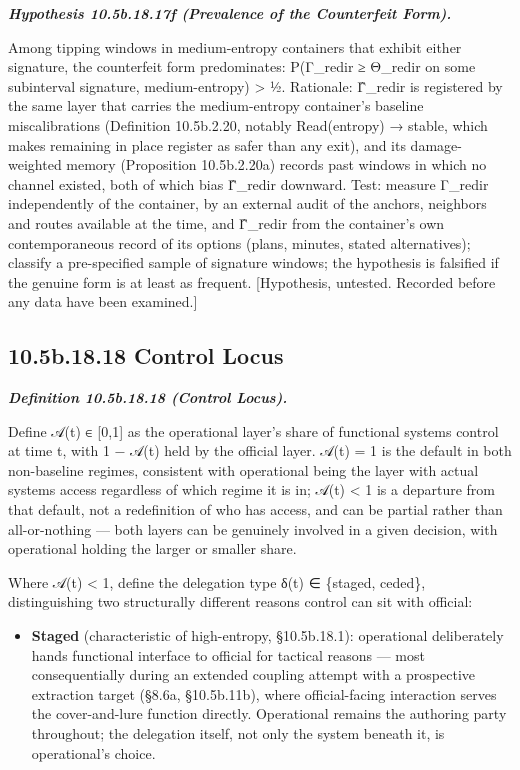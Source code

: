 \documentclass[
]{article}
\begin{document}
\emph{\textbf{Hypothesis 10.5b.18.17f (Prevalence of the Counterfeit
Form).}}

Among tipping windows in medium-entropy containers that exhibit either
signature, the counterfeit form predominates: P(Γ\_redir ≥ Θ\_redir on
some subinterval \textbar{} signature, medium-entropy) \textgreater{} ½.
Rationale: Γ̂\_redir is registered by the same layer that carries the
medium-entropy container's baseline miscalibrations (Definition
10.5b.2.20, notably Read(entropy) → stable, which makes remaining in
place register as safer than any exit), and its damage-weighted memory
(Proposition 10.5b.2.20a) records past windows in which no channel
existed, both of which bias Γ̂\_redir downward. Test: measure Γ\_redir
independently of the container, by an external audit of the anchors,
neighbors and routes available at the time, and Γ̂\_redir from the
container's own contemporaneous record of its options (plans, minutes,
stated alternatives); classify a pre-specified sample of signature
windows; the hypothesis is falsified if the genuine form is at least as
frequent. {[}Hypothesis, untested. Recorded before any data have been
examined.{]}

\hypertarget{b.18.18-control-locus}{%
\subsection{10.5b.18.18 Control Locus}\label{b.18.18-control-locus}}

\emph{\textbf{Definition 10.5b.18.18 (Control Locus).}}

Define 𝒜(t) ∈ {[}0,1{]} as the operational layer's share of functional
systems control at time t, with 1 − 𝒜(t) held by the official layer.
𝒜(t) = 1 is the default in both non-baseline regimes, consistent with
operational being the layer with actual systems access regardless of
which regime it is in; 𝒜(t) \textless{} 1 is a departure from that
default, not a redefinition of who has access, and can be partial rather
than all-or-nothing --- both layers can be genuinely involved in a given
decision, with operational holding the larger or smaller share.

Where 𝒜(t) \textless{} 1, define the delegation type δ(t) ∈ \{staged,
ceded\}, distinguishing two structurally different reasons control can
sit with official:

\begin{itemize}
\item
  \textbf{Staged} (characteristic of high-entropy, §10.5b.18.1):
  operational deliberately hands functional interface to official for
  tactical reasons --- most consequentially during an extended coupling
  attempt with a prospective extraction target (§8.6a, §10.5b.11b),
  where official-facing interaction serves the cover-and-lure function
  directly. Operational remains the authoring party throughout; the
  delegation itself, not only the system beneath it, is operational's
  choice.
\end{itemize}
\end{document}
